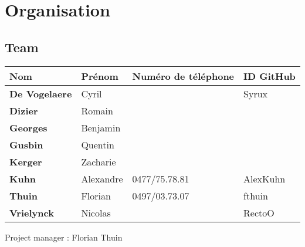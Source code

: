 \section{Organisation}

\subsection{Team}

\begin{tabular}{|l|l|l|l|}
    \hline
    Nom & Prénom & Numéro de téléphone & ID GitHub \\
    \hline
    \hline
    \textbf{De Vogelaere} & Cyril & & Syrux\\
    \hline
    \textbf{Dizier} & Romain & & \\
    \hline
    \textbf{Georges} & Benjamin & & \\
    \hline
    \textbf{Gusbin} & Quentin & & \\
    \hline
    \textbf{Kerger} & Zacharie & & \\
    \hline
    \textbf{Kuhn} & Alexandre & 0477/75.78.81 & AlexKuhn \\
    \hline
    \textbf{Thuin} & Florian & 0497/03.73.07 & fthuin\\
    \hline
    \textbf{Vrielynck} & Nicolas & & RectoO \\
    \hline
\end{tabular}

Project manager : Florian Thuin
